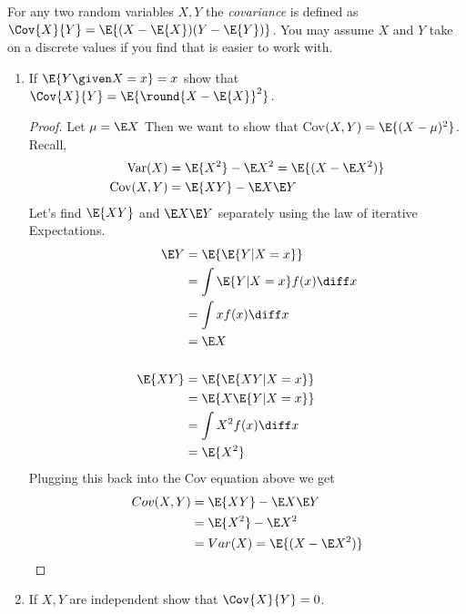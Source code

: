 \documentclass{article}
\begin{document}
\newpage
\begin{aprob}
    For any two random variables $X,Y$ the \emph{covariance} is defined as $\Cov{X}{Y}=\E{(X-\E{X})(Y-\E{Y})}$.
    You may assume $X$ and $Y$ take on a discrete values if you find that is easier to work with.
    \begin{enumerate}
        \item {} If $\E{Y\given X=x} = x$ show that $\Cov{X}{Y} = \E{\round{X-\E{X}}^2}$.
            \begin{proof}
                Let $\mu = \E X$ Then we want to show that Cov$(X,Y) = \E {(X-\mu)^2}$. Recall, 
                \begin{align*}
                    \text{Var}(X) & = \E {X^2} - \E X^2 = \E {(X-\E X ^2)} \\
                    \text{Cov}(X,Y) & = \E {XY} - \E X \E Y \\
                \end{align*}
                Let's find $\E {XY}$ and $\E X \E Y $ separately using the law of iterative Expectations.
                \begin{align*}
                    \E Y & = \E {\E {Y|X = x}} \\
                    & = \int \E {Y|X = x} f(x) \diff x \\
                    & = \int x f(x) \diff x \\
                    & = \E X \\ \\
                    \E {XY} & = \E {\E {XY | X = x} } \\
                    & = \E {X \E{Y|X = x}} \\
                    & = \int X^2 f(x) \diff x \\
                    & = \E {X^2} \\
                \end{align*}
                Plugging this back into the Cov equation above we get
                \begin{align*}
                    Cov(X,Y) &= \E{XY} - \E X \E Y \\
                    &= \E {X^2} - \E X ^2 \\
                    &= Var(X) = \E {(X-\E X ^2)} \\
                \end{align*}
            \end{proof}
        \newpage
            \item {} If $X, Y$ are independent show that $\Cov{X}{Y}=0$.

\end{enumerate}
\end{aprob}
\end{document}

